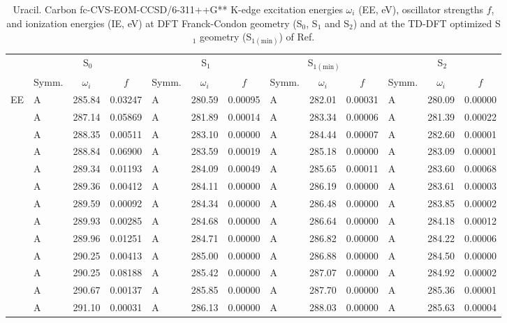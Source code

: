 \documentclass[journal=jctcce,manuscript=article]{achemso}
\begin{document}
\begin{table}
\caption{Uracil.  Carbon fc-CVS-EOM-CCSD/6-311++G** K-edge excitation energies $\omega_i$ (EE, eV), oscillator strengths $f$, and ionization energies (IE, eV) at DFT Franck-Condon geometry (S$_0$, S$_1$ and S$_2$) and at the TD-DFT optimized S$_1$ geometry (S$_{1(\text{min})}$) of Ref. 
\label{Tab:Uracil_DFT:Carbon}}
\scriptsize
\begin{tabular}{l|lcc|lcc|lcc|lcc}
\cline{2-13}
& \multicolumn{3}{c|}{S$_0$}
& \multicolumn{3}{c|}{S$_1$}  
& \multicolumn{3}{c|}{S$_{1(\text{min})}$}
& \multicolumn{3}{c}{S$_2$}
\\
\cline{2-13}
& Symm. & $\omega_i$ & $f$ 
& Symm. & $\omega_i$ & $f$ 
& Symm. & $\omega_i$ & $f$ 
& Symm. & $\omega_i$ & $f$\\
\hline
  EE 
& A & 285.84 & 0.03247 & A & 280.59 & 0.00095 & A & 282.01 & 0.00031 & A & 280.09 & 0.00000 \\ 
& A & 287.14 & 0.05869 & A & 281.89 & 0.00014 & A & 283.34 & 0.00006 & A & 281.39 & 0.00022 \\ 
& A & 288.35 & 0.00511 & A & 283.10 & 0.00000 & A & 284.44 & 0.00007 & A & 282.60 & 0.00001 \\ 
& A & 288.84 & 0.06900 & A & 283.59 & 0.00019 & A & 285.18 & 0.00000 & A & 283.09 & 0.00001 \\ 
& A & 289.34 & 0.01193 & A & 284.09 & 0.00049 & A & 285.65 & 0.00011 & A & 283.60 & 0.00068 \\ 
& A & 289.36 & 0.00412 & A & 284.11 & 0.00000 & A & 286.19 & 0.00000 & A & 283.61 & 0.00003 \\ 
& A & 289.59 & 0.00092 & A & 284.34 & 0.00000 & A & 286.48 & 0.00000 & A & 283.85 & 0.00002 \\ 
& A & 289.93 & 0.00285 & A & 284.68 & 0.00000 & A & 286.64 & 0.00000 & A & 284.18 & 0.00012 \\ 
& A & 289.96 & 0.01251 & A & 284.71 & 0.00000 & A & 286.82 & 0.00000 & A & 284.22 & 0.00006 \\ 
& A & 290.25 & 0.00413 & A & 285.00 & 0.00000 & A & 286.88 & 0.00000 & A & 284.50 & 0.00000 \\ 
& A & 290.25 & 0.08188 & A & 285.42 & 0.00000 & A & 287.07 & 0.00000 & A & 284.92 & 0.00002 \\ 
& A & 290.67 & 0.00137 & A & 285.85 & 0.00000 & A & 287.70 & 0.00000 & A & 285.36 & 0.00001 \\ 
& A & 291.10 & 0.00031 & A & 286.13 & 0.00000 & A & 288.03 & 0.00000 & A & 285.63 & 0.00004 \\ 

\end{tabular}
\end{table}
\end{document}
